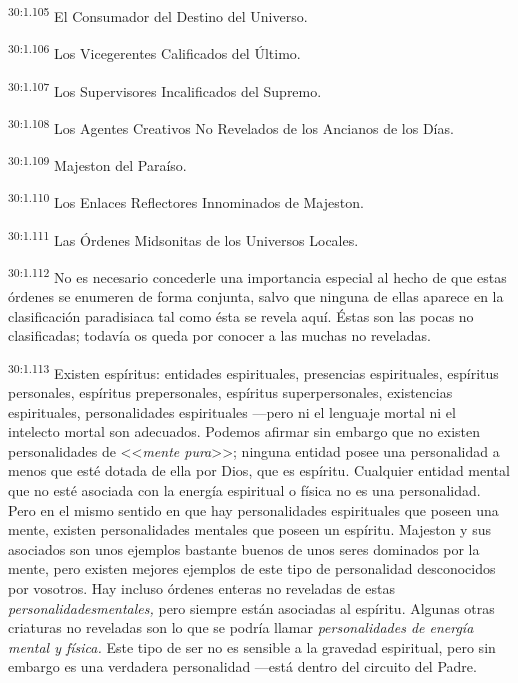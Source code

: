 \par
\textsuperscript{30:1.105} El Consumador del Destino del Universo.

\par
\textsuperscript{30:1.106} Los Vicegerentes Calificados del Último.

\par
\textsuperscript{30:1.107} Los Supervisores Incalificados del Supremo.

\par
\textsuperscript{30:1.108} Los Agentes Creativos No Revelados de los Ancianos de los Días.

\par
\textsuperscript{30:1.109} Majeston del Paraíso.

\par
\textsuperscript{30:1.110} Los Enlaces Reflectores Innominados de Majeston.

\par
\textsuperscript{30:1.111} Las Órdenes Midsonitas de los Universos Locales.

\par
\textsuperscript{30:1.112} No es necesario concederle una importancia especial al hecho de que estas órdenes se enumeren de forma conjunta, salvo que ninguna de ellas aparece en la clasificación paradisiaca tal como ésta se revela aquí. Éstas son las pocas no clasificadas; todavía os queda por conocer a las muchas no reveladas.

\par
\textsuperscript{30:1.113} Existen espíritus: entidades espirituales, presencias espirituales, espíritus personales, espíritus prepersonales, espíritus superpersonales, existencias espirituales, personalidades espirituales ---pero ni el lenguaje mortal ni el intelecto mortal son adecuados. Podemos afirmar sin embargo que no existen personalidades de <<\textit{mente pura}>>; ninguna entidad posee una personalidad a menos que esté dotada de ella por Dios, que es espíritu. Cualquier entidad mental que no esté asociada con la energía espiritual o física no es una personalidad. Pero en el mismo sentido en que hay personalidades espirituales que poseen una mente, existen personalidades mentales que poseen un espíritu. Majeston y sus asociados son unos ejemplos bastante buenos de unos seres dominados por la mente, pero existen mejores ejemplos de este tipo de personalidad desconocidos por vosotros. Hay incluso órdenes enteras no reveladas de estas \textit{personalidadesmentales,} pero siempre están asociadas al espíritu. Algunas otras criaturas no reveladas son lo que se podría llamar \textit{personalidades de energía mental y física.} Este tipo de ser no es sensible a la gravedad espiritual, pero sin embargo es una verdadera personalidad ---está dentro del circuito del Padre.

